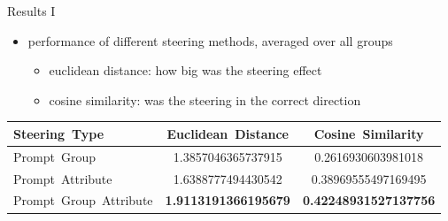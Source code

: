 \documentclass[]{beamer}
\begin{document}
\begin{frame}{Results I}
  \begin{itemize}
    \item performance of different steering methods, averaged over all groups
          \begin{itemize}
            \item euclidean distance: how big was the steering effect
            \item cosine similarity: was the steering in the correct direction
          \end{itemize}
  \end{itemize}
  \begin{tabular}{lSS}
    \toprule
    {Steering\ Type}         & {Euclidean\ Distance}                              & {Cosine\ Similarity}                                \\
    \midrule
    Prompt\ Group            & 1.3857046365737915                                 & 0.2616930603981018                                  \\
    Prompt\ Attribute        & 1.6388777494430542                                 & 0.38969555497169495                                 \\
    Prompt\ Group\ Attribute &  \bfseries 1.9113191366195679 &  \bfseries 0.42248931527137756 \\
    \bottomrule
  \end{tabular}
\end{frame}
\end{document}
